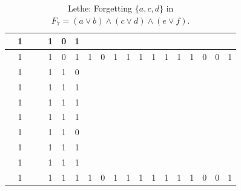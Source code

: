 \begin{table}[!tb]
\begin{tabular}{|c|c|c|c|c|c|c|c|c|c|c|c|c|c|c|c|c|c|c|}
        \rowcolor{blue!40}  & 1 &  &  & 1 & 0 & 1 &  &  &  &  &  &  &  &  &  &  &  &  \\ \hline
        \rowcolor{blue!40}  & 1 &  &  & 1 & 0 & 1 & 1 & 0 & 1 & 1 & 1 & 1 & 1 & 1 & 1 & 0 & 0 & 1 \\ \hline
        \rowcolor{red!40}  & 1 &  &  & 1 & 1 & 0 &  &  &  &  &  &  &  &  &  &  &  &  \\ \hline
        \rowcolor{red!40}  & 1 &  &  & 1 & 1 & 1 &  &  &  &  &  &  &  &  &  &  &  &  \\ \hline
        \rowcolor{red!40}  & 1 &  &  & 1 & 1 & 1 &  &  &  &  &  &  &  &  &  &  &  &  \\ \hline
        \rowcolor{red!40}  & 1 &  &  & 1 & 1 & 1 &  &  &  &  &  &  &  &  &  &  &  &  \\ \hline
        \rowcolor{red!40}  & 1 &  &  & 1 & 1 & 0 &  &  &  &  &  &  &  &  &  &  &  &  \\ \hline
        \rowcolor{red!40}  & 1 &  &  & 1 & 1 & 1 &  &  &  &  &  &  &  &  &  &  &  &  \\ \hline
        \rowcolor{red!40}  & 1 &  &  & 1 & 1 & 1 &  &  &  &  &  &  &  &  &  &  &  &  \\ \hline
        \rowcolor{red!40}  & 1 &  &  & 1 & 1 & 1 & 1 & 0 & 1 & 1 & 1 & 1 & 1 & 1 & 1 & 0 & 0 & 1 \\ \hline
    \end{tabular}
    \caption{Lethe: Forgetting $\{a, c, d\}$ in $F_{7} = (a \lor b) \land (c \lor d) \land (e \lor f)$.}
    \label{tab:lethe-F7-acd}
\end{table}
